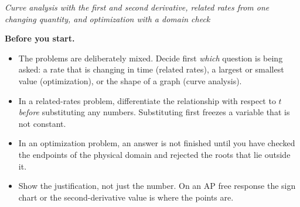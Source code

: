 \documentclass[12pt]{article}
\begin{document}

\begin{center}
\textit{Curve analysis with the first and second derivative, related rates from
one changing quantity, and optimization with a domain check}
\end{center}

\noindent\textbf{Before you start.}
\begin{itemize}[leftmargin=1.2cm, itemsep=2pt, topsep=2pt]
\item The problems are deliberately mixed. Decide first \emph{which} question
is being asked: a rate that is changing in time (related rates), a largest or
smallest value (optimization), or the shape of a graph (curve analysis).
\item In a related-rates problem, differentiate the relationship with respect
to $t$ \emph{before} substituting any numbers. Substituting first freezes a
variable that is not constant.
\item In an optimization problem, an answer is not finished until you have
checked the endpoints of the physical domain and rejected the roots that lie
outside it.
\item Show the justification, not just the number. On an AP free response the
sign chart or the second-derivative value is where the points are.
\end{itemize}

\bigskip




\end{document}
